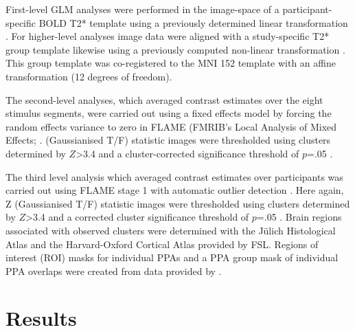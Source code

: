 \documentclass[english]{article}
\begin{document}
First-level GLM analyses were performed in the image-space of a participant-specific BOLD
T2* template
using a previously determined linear transformation \citep{sengupta2016extension}.
For higher-level analyses image data were aligned with a study-specific T2* group template
likewise using a previously computed non-linear transformation \citep{hanke2014audiomovie}.
This group template was co-registered to the MNI 152 template with an affine
transformation (12 degrees of freedom).

The second-level analyses, which averaged contrast estimates over the eight
stimulus segments, were carried out using a fixed effects model by forcing the
random effects variance to zero in FLAME (FMRIB's Local Analysis of Mixed
Effects; \citep{beckmann2003general, woolrich2004multilevel}.
(Gaussianised T/F) statistic images were thresholded using clusters determined
by $Z$>3.4 and a cluster-corrected significance threshold of $p$=.05
\citep{worsley2001statistical}.

The third level analysis which averaged contrast estimates over participants was
carried out using FLAME stage 1 with automatic outlier detection
\citep{beckmann2003general, woolrich2004multilevel, woolrich2008robust}.
Here again, Z (Gaussianised T/F) statistic images were thresholded using
clusters determined by $Z$>3.4 and a corrected cluster significance threshold of
$p$=.05 \citep{worsley2001statistical}.
Brain regions associated with observed clusters were determined with the Jülich
Histological Atlas \citep{eickhoff2005toolbox, eickhoff2007assignment} and the
Harvard-Oxford Cortical Atlas \citep{desikan2006automated} provided by FSL.
Regions of interest (ROI) masks for individual PPAs and a PPA group mask of
individual PPA overlaps were created from data provided by
\citep{sengupta2016extension}.


\section{Results}
\end{document}
